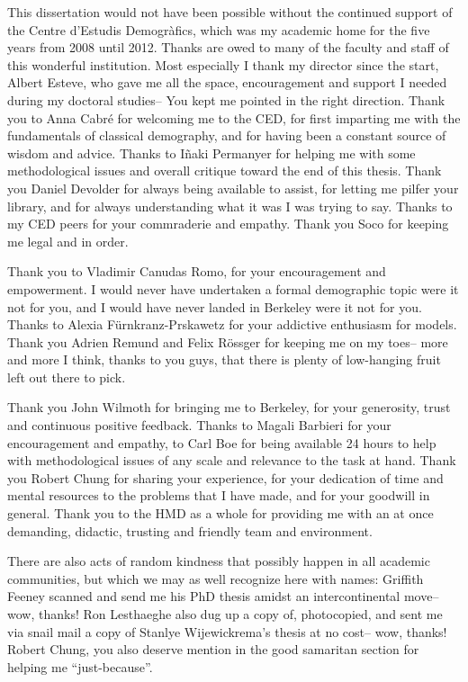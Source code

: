 % 
This dissertation would not have been possible without the continued support of
the Centre d'Estudis Demogr\`{a}fics, which was my academic home for the five
years from 2008 until 2012. Thanks are owed to many of the faculty and
staff of this wonderful institution. Most especially I thank my director since
the start, Albert Esteve, who gave me all the space, encouragement and support I
needed during my doctoral studies-- You kept me pointed in the right
direction. Thank you to Anna Cabr\'{e} for welcoming me to the CED,
for first imparting me with the fundamentals of classical demography, and for
having been a constant source of wisdom and advice. Thanks to I\~{n}aki
Permanyer for helping me with some methodological issues and overall critique
toward the end of this thesis. Thank you Daniel Devolder for always being
available to assist, for letting me pilfer your library, and for always
understanding what it was I was trying to say. Thanks to my CED peers for your
commraderie and empathy. Thank you Soco for keeping me legal and in
order.

Thank you to Vladimir Canudas Romo, for your encouragement and
empowerment. I would never have undertaken a formal demographic topic were it
not for you, and I would have never landed in Berkeley were it not for
you. Thanks to Alexia F\"{u}rnkranz-Prskawetz for your addictive enthusiasm for
models. Thank you Adrien Remund and Felix R\"{o}ssger for keeping me on my
toes-- more and more I think, thanks to you guys, that there is plenty of
low-hanging fruit left out there to pick.

Thank you John Wilmoth for bringing me to Berkeley, for your generosity, trust
and continuous positive feedback. Thanks to Magali Barbieri for your
encouragement and empathy, to Carl Boe for being available 24 hours to help with
methodological issues of any scale and relevance to the task at hand. Thank you
Robert Chung for sharing your experience, for your dedication of time
and mental resources to the problems that I have made, and for your goodwill in
general. Thank you to the HMD as a whole for providing me with an at once demanding,
didactic, trusting and friendly team and environment.

There are also acts of random kindness that possibly happen in all academic
communities, but which we may as well recognize here with names: Griffith Feeney
scanned and send me his PhD thesis amidst an intercontinental move-- wow,
thanks! Ron Lesthaeghe also dug up a copy of, photocopied, and sent me via snail mail a copy
of Stanlye Wijewickrema's thesis at no cost-- wow, thanks! Robert Chung, you
also deserve mention in the good samaritan section for helping me
``just-because''.


